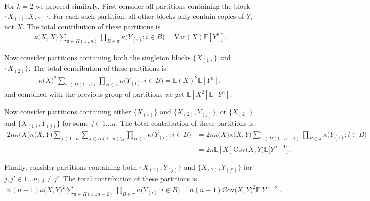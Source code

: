 \documentclass{article}
\theoremstyle{plain}
\theoremstyle{definition}
\theoremstyle{remark}
\newcommand{\E}{\mathbb{E}}
\begin{document}
For $k = 2$ we proceed similarly. First consider all partitions containing the block $\{ X_{(1)}, X_{(2)} \}$. For each such partition, all other blocks only contain copies of $Y$, not $X$. The total contribution of these partitions is
\begin{align}
    \kappa \big ( X, X \big ) \sum_{\pi \in \Pi(1 \ldots n)} \prod_{B \in \pi} \kappa \big ( Y_{(i)} : i \in B \big ) = \mathrm{Var}(X) \E[Y^n].
\end{align}

Now consider partitions containing both the singleton blocks $\{ X_{(1)} \}$ and $\{ X_{(2)} \}$. The total contribution of these partitions is
\begin{align}
    \kappa \big ( X \big )^2 \sum_{\pi \in \Pi(1 \ldots n)} \prod_{B \in \pi} \kappa \big ( Y_{(i)} : i \in B \big ) = \E(X)^2 \E[Y^n],
\end{align}
and combined with the previous group of partitions we get $\E[X^2] \E[Y^n]$.

Now consider partitions containing either $\{ X_{(1)} \}$ and $\{ X_{(2)}, Y_{(j)} \}$, or $\{ X_{(2)} \}$ and $\{ X_{(1)}, Y_{(j)} \}$ for some $j \in 1 \ldots n$. The total contribution of these partitions is
\begin{align}
    2n \kappa \big ( X \big ) \kappa \big ( X, Y \big ) \sum_{j \in 1 \ldots n} \sum_{\pi \in \Pi(1 \ldots n) \setminus j} \prod_{B \in \pi} \kappa \big ( Y_{(i)} : i \in B \big ) &= 2n \kappa \big ( X \big ) \kappa \big ( X, Y \big ) \sum_{\pi \in \Pi(1 \ldots n - 1)} \prod_{B \in \pi} \kappa \big ( Y_{(i)} : i \in B \big ) \\
    &= 2n \E[X] \mathrm{Cov} \big ( X, Y \big ) \E \big [ Y^{n - 1} \big ].
\end{align}

Finally, consider partitions containing both $\{ X_{(1)}, Y_{(j)} \}$ and $\{ X_{(2)}, Y_{(j')} \}$ for $j, j' \in 1 \ldots n$, $j \neq j'$. The total contribution of these partitions is
\begin{align}
    n(n - 1) \kappa \big ( X, Y \big )^2 \sum_{\pi \in \Pi(1 \ldots n - 2)} \prod_{B \in \pi} \kappa \big ( Y_{(i)} : i \in B \big ) = n(n - 1) \mathrm{Cov} \big ( X, Y \big )^2 \E \big [ Y^{n - 2} \big ].
\end{align}
\end{document}
